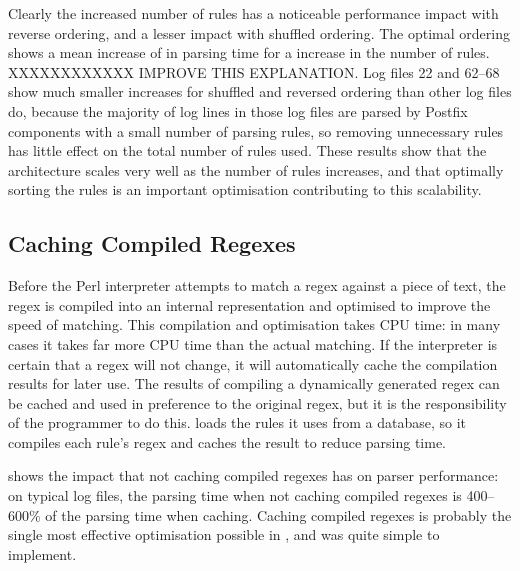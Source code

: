 Clearly the increased number of rules has a noticeable performance impact
with reverse ordering, and a lesser impact with shuffled ordering.  The
optimal ordering shows a mean increase of
 in parsing time for a
\numberOFrulesMAXIMUMpercentage{} increase in the number of rules.
XXXXXXXXXXXX IMPROVE THIS EXPLANATION\@.  Log files 22 and 62--68 show much
smaller increases for shuffled and reversed ordering than other log files
do, because the majority of log lines in those log files are parsed by
Postfix components with a small number of parsing rules, so removing
unnecessary rules has little effect on the total number of rules used.
These results show that the architecture scales very well as the number of
rules increases, and that optimally sorting the rules is an important
optimisation contributing to this scalability.

\subsection{Caching Compiled Regexes}

\label{Caching compiled regexes}

Before the Perl interpreter attempts to match a regex against a piece of
text, the regex is compiled into an internal representation and optimised
to improve the speed of matching.  This compilation and optimisation takes
CPU time: in many cases it takes far more CPU time than the actual
matching.  If the interpreter is certain that a regex will not change, it
will automatically cache the compilation results for later use.   The
results of compiling a dynamically generated regex can be cached and used
in preference to the original regex, but it is the responsibility of the
programmer to do this.  \parsername{} loads the rules it uses from a
database, so it compiles each rule's regex and caches the result to reduce
parsing time.

shows the impact that not caching compiled regexes has on parser
performance: on typical log files, the parsing time when not caching
compiled regexes is 400--600\% of the parsing time when caching.  Caching
compiled regexes is probably the single most effective optimisation
possible in \parsername{}, and was quite simple to implement.



